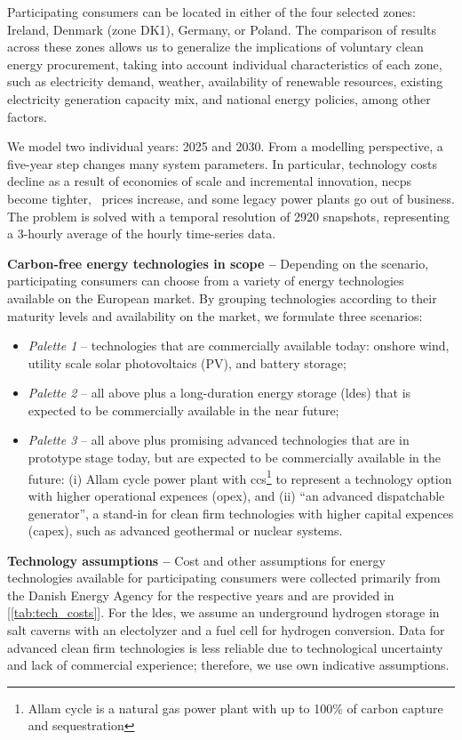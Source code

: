 \documentclass[11pt, 5p, nopreprintline]{elsarticle}
\newcommand{\co}{\ce{CO2}}
\begin{document}
Participating consumers can be located in either of the four selected zones: Ireland, Denmark (zone DK1), Germany, or Poland.
The comparison of results across these zones allows us to generalize the implications of voluntary clean energy procurement, taking into account individual characteristics of each zone, such as electricity demand, weather, availability of renewable resources, existing electricity generation capacity mix, and national energy policies, among other factors.

We model two individual years: 2025 and 2030.
From a modelling perspective, a five-year step changes many system parameters.
In particular, technology costs decline as a result of economies of scale and incremental innovation, \gls{necp}s become tighter, \co~prices increase, and some legacy power plants go out of business.
The problem is solved with a temporal resolution of 2920 snapshots, representing a 3-hourly average of the hourly time-series data.

\textbf{Carbon-free energy technologies in scope --} Depending on the scenario, participating consumers can choose from a variety of energy technologies available on the European market. By grouping technologies according to their maturity levels and availability on the market, we formulate three scenarios:

\begin{itemize}[-]
    \item \textit{Palette 1} -- technologies that are commercially available today: onshore wind, utility scale solar photovoltaics (\gls{PV}), and battery storage;
    \item \textit{Palette 2} -- all above plus a long-duration energy storage (\gls{ldes}) that is expected to be commercially available in the near future;
    \item \textit{Palette 3} -- all above plus promising advanced technologies that are in prototype stage today, but are expected to be commercially available in the future: (i) Allam cycle power plant with \gls{ccs}\footnote{Allam cycle is a natural gas power plant with up to 100\% of carbon capture and sequestration} to represent a technology option with higher operational expences (\gls{opex}), and (ii) \enquote{an advanced dispatchable generator}, a stand-in for clean firm technologies with higher capital expences (\gls{capex}), such as advanced geothermal or nuclear systems.
\end{itemize}

\textbf{Technology assumptions --} Cost and other assumptions for energy technologies available for participating consumers were collected primarily from the Danish Energy Agency \cite{DEA-technologydata} for the respective years and are provided in [\cref{tab:tech_costs}].
For the \gls{ldes}, we assume an underground hydrogen storage in salt caverns with an electolyzer and a fuel cell for hydrogen conversion.
Data for advanced clean firm technologies is less reliable due to technological uncertainty and lack of commercial experience; therefore, we use own indicative assumptions.
\end{document}

